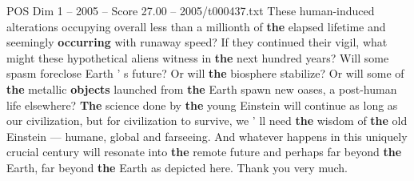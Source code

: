\begin{textsample}{POS Dim 1 – 2005 – Score 27.00 – 2005/t000437.txt}
These human-induced alterations occupying overall less than a millionth of \textbf{the} elapsed lifetime and seemingly \textbf{occurring} with runaway speed?
If they continued their vigil, what might these hypothetical aliens witness in \textbf{the} next hundred years?
Will some spasm foreclose Earth ' s future?
Or will \textbf{the} biosphere stabilize?
Or will some of \textbf{the} metallic \textbf{objects} launched from \textbf{the} Earth spawn new oases, a post-human life elsewhere? \textbf{The} science done by \textbf{the} young Einstein will continue as long as our civilization, but for civilization to survive, we ' ll need \textbf{the} wisdom of \textbf{the} old Einstein — humane, global and farseeing.
And whatever happens in this uniquely crucial century will resonate into \textbf{the} remote future and perhaps far beyond \textbf{the} Earth, far beyond \textbf{the} Earth as depicted here.
Thank you very much.

\end{textsample}
